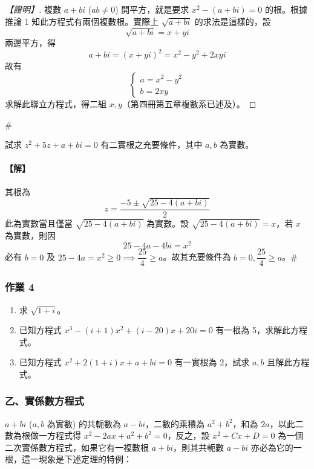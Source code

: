 \begin{proof}[【證明】]
複數 $a+bi$ ($ab \ne 0$) 開平方，就是要求 $x^2-(a+bi)=0$ 的根。根據推論 1 知此方程式有兩個複數根。實際上 $\sqrt{a+bi}$ 的求法是這樣的，設
\[ \sqrt{a+bi} = x+yi \]
兩邊平方，得
\[ a+bi = (x+yi)^2 = x^2-y^2 + 2xyi \]
故有
\[ \begin{cases} a = x^2-y^2 \\ b = 2xy \end{cases} \]
求解此聯立方程式，得二組 $x, y$（第四冊第五章複數系已述及）。
\end{proof}\hfill$\#$

\begin{example}\label{ex:b6-2-4}
試求 $z^2+5z+a+bi=0$ 有二實根之充要條件，其中 $a, b$ 為實數。
\end{example}

\paragraph{【解】}
其根為
\[ z = \dfrac{-5 \pm \sqrt{25 - 4(a+bi)}}{2} \]
此為實數當且僅當 $\sqrt{25 - 4(a+bi)}$ 為實數。設 $\sqrt{25 - 4(a+bi)} = x$，若 $x$ 為實數，則因
\[ 25 - 4a - 4bi = x^2 \]
必有 $b=0$ 及 $25-4a = x^2 \ge 0 \implies \dfrac{25}{4} \ge a$。故其充要條件為 $b=0, \dfrac{25}{4} \ge a$。\hfill$\#$

\subsubsection*{作業 4}\label{hw:b6-2-4}
\begin{enumerate}[label=(\roman*), leftmargin=2em]
  \item 求 $\sqrt{1+i}$。
  \item 已知方程式 $x^3 - (i+1)x^2 + (i-20)x + 20i = 0$ 有一根為 5，求解此方程式。
  \item 已知方程式 $x^2 + 2(1+i)x + a + bi = 0$ 有一實根為 2，試求 $a, b$ 且解此方程式。
\end{enumerate}

\subsubsection*{乙、實係數方程式}\label{subsec:b6-2-2-b}

$a+bi$ ($a, b$ 為實數) 的共軛數為 $a-bi$，二數的乘積為 $a^2+b^2$，和為 $2a$，以此二數為根做一方程式得 $x^2 - 2ax + a^2 + b^2 = 0$，反之，設 $x^2 + Cx + D = 0$ 為一個二次實係數方程式，如果它有一複數根 $a+bi$，則其共軛數 $a-bi$ 亦必為它的一根，這一現象是下述定理的特例：

